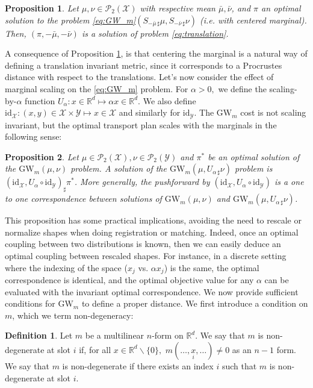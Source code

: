 \documentclass{article}
\newcommand{\R}{\mathbb{R}}
\newcommand{\Y}{\mathcal{Y}}
\newcommand{\X}{\mathcal{X}}
\newcommand{\1}{\mathbf{1}}
\newcommand{\GW}{\mathrm{GW}}
\renewcommand{\P}{\mathcal{P}}
\newtheorem{proposition}{Proposition}
\theoremstyle{definition}
\newtheorem{definition}{Definition}
\theoremstyle{remark}
\begin{document}
\begin{proposition}\label{proposition:translation}
     Let  $\mu,\nu\in \P_2(\X)$ with respective mean $\bar{\mu}, \bar{\nu}$, and  $\pi$ an optimal solution to the problem \ref{eq:GW_m}$(S_{-\bar{\mu}\,\sharp}\mu ,S_{-\bar{\nu}\,\sharp}\nu)$ (i.e. with centered marginal). Then, $(\pi, -\bar{\mu},-\bar{\nu})$ is a solution of problem \eqref{eq:translation}.
\end{proposition}


A consequence of Proposition \ref{proposition:translation}, is that centering the marginal is a natural way of defining a translation invariant metric, since it corresponds to a Procrustes distance with respect to the translations. Let's now consider the effect of marginal scaling on the \ref{eq:GW_m} problem. For $\alpha>0,$ we define the scaling-by-$\alpha$ function  $U_{\alpha}:x\in\R^d\mapsto\alpha x\in\R^d$. We also define $\mathrm{id}_\X:(x,y)\in\X\times\Y\mapsto x\in \X$ and similarly for $\mathrm{id}_\Y$. The $\GW_m$ cost is not scaling invariant, but the optimal transport plan scales with the marginals in the following sense:  
\begin{proposition}\label{proposition:scaling}
    Let $\mu\in \P_2(\X),\nu\in \P_2(\Y)$ and $\pi^*$ be an optimal solution of the $\GW_m(\mu,\nu)$ problem. A solution of the $\GW_m(\mu,U_{\alpha\,\sharp}\nu)$ problem is $(\mathrm{id}_\X,U_{\alpha}\circ\mathrm{id}_\Y)_{\sharp}\pi^*$. More generally, the pushforward by $(\mathrm{id}_\X,U_{\alpha}\circ\mathrm{id}_\Y)$ is a one to one correspondence between solutions of $\GW_m(\mu,\nu)$ and $\GW_m(\mu,U_{\alpha\,\sharp}\nu)$.
\end{proposition}
 This proposition has some practical implications, avoiding the need to rescale or normalize shapes when doing registration or matching. Indeed, once an optimal coupling between two distributions is known, then we can easily deduce an optimal coupling between rescaled shapes. For instance, in a discrete setting where the indexing of the space ($x_j$ vs. $\alpha x_j$) is the same, the optimal correspondence is identical, and the optimal objective value for any $\alpha$ can be evaluated with the invariant optimal correspondence.
We now provide sufficient conditions for $\GW_m$ to define a proper distance. 
We first introduce a condition on $m$, which we term non-degeneracy:

\begin{definition}
    Let $m$ be a multilinear $n$-form on $\R^d$.
    We say that $m$ is non-degenerate at slot  $i$ if, for all  $x\in \R^d\backslash \{0\},$ $ m(\dots,\underset{i}{x}, \dots)\neq0$ as an $n-1$ form.
    We say that $m$ is non-degenerate if there exists an index $i$ such that $m$ is non-degenerate at slot  $i$.
\end{definition}
\end{document}
